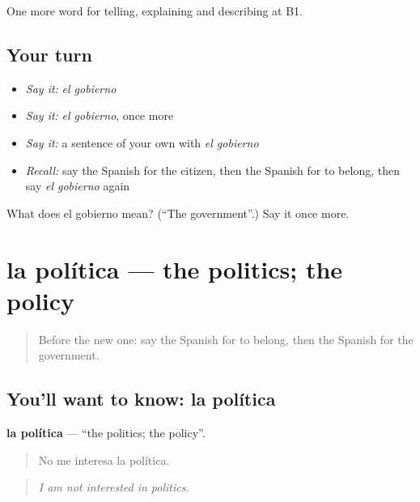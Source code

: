 \begin{grammarlens}[title={What you've built}]
One more word for telling, explaining and describing at B1.
\end{grammarlens}

\subsection*{Your turn}
\begin{itemize}
\raggedright
  \item \emph{Say it:} \emph{el gobierno}
  \item \emph{Say it:} \emph{el gobierno}, once more
  \item \emph{Say it:} a sentence of your own with \emph{el gobierno}
  \item \emph{Recall:} say the Spanish for the citizen, then the Spanish for to belong, then say \emph{el gobierno} again
\end{itemize}

\begin{tcolorbox}[breakable,colback=teal!4,colframe=teal!35!black,title={Before you move on}]
What does el gobierno mean? (\textquotedblleft{}The government\textquotedblright{}.) Say it once more.
\end{tcolorbox}
\section[la política]{la política — the politics; the policy}

\label{lesson:ES-C601-politica}



\begin{quote}
Before the new one: say the Spanish for to belong, then the Spanish for the government.
\end{quote}

\subsection*{You'll want to know: la política}
\textbf{la política} — \textquotedblleft{}the politics; the policy\textquotedblright{}.

\begin{quote}
No me interesa la política.
\end{quote}

\begin{quote}
\emph{I am not interested in politics.}
\end{quote}

